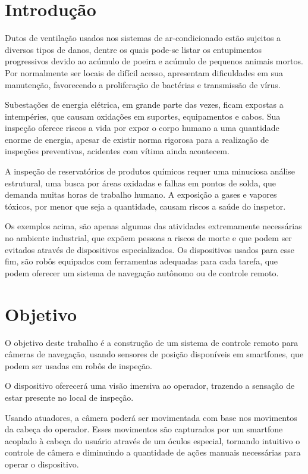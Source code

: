 \documentclass[12pt,a4paper]{article}
\begin{document}
\section{Introdução}
	Dutos de ventilação usados nos sistemas de ar-condicionado estão sujeitos a diversos tipos de danos, dentre os quais pode-se listar os entupimentos progressivos devido ao acúmulo de poeira e acúmulo de pequenos animais mortos. Por normalmente ser locais de difícil acesso, apresentam dificuldades em sua manutenção, favorecendo a proliferação de bactérias e transmissão de vírus\cite{carmo1999qualidade}\cite{bortoletto2002contaminaccao}.\par
	Subestações de energia elétrica, em grande parte das vezes, ficam expostas a intempéries, que causam oxidações em suportes, equipamentos e cabos. Sua inspeção oferece riscos a vida por expor o corpo humano a uma quantidade enorme de energia, apesar de existir norma rigorosa para a realização de inspeções preventivas, acidentes com vítima ainda acontecem\cite{santos2012inspeccao}.\par
	A inspeção de reservatórios de produtos químicos requer uma minuciosa análise estrutural, uma busca por áreas oxidadas e falhas em pontos de solda, que demanda muitas horas de trabalho humano. A exposição a gases e vapores tóxicos, por menor que seja a quantidade, causam riscos a saúde do inspetor\cite{souza2012inspeccao}\cite{molina2008metodo}.\par
	Os exemplos acima, são apenas algumas das atividades extremamente necessárias no ambiente industrial, que expõem pessoas a riscos de morte e que podem ser evitados através de dispositivos especializados. Os dispositivos usados para esse fim, são robôs equipados com ferramentas adequadas para cada tarefa, que podem oferecer um sistema de navegação autônomo ou de controle remoto.

\section{Objetivo}
	O objetivo deste trabalho é a construção de um sistema de controle remoto para câmeras de navegação, usando sensores de posição disponíveis em smartfones, que podem ser usadas em robôs de inspeção.\par
	O dispositivo oferecerá uma visão imersiva ao operador, trazendo a sensação de estar presente no local de inspeção.\par
	Usando atuadores, a câmera poderá ser movimentada com base nos movimentos da cabeça do operador. Esses movimentos são capturados por um smartfone acoplado à cabeça do usuário através de um óculos especial, tornando intuitivo o controle de câmera e diminuindo a quantidade de ações manuais necessárias para operar o dispositivo.
\end{document}
